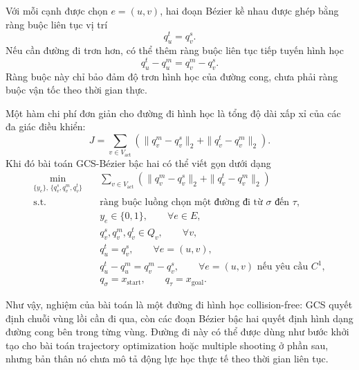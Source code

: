 Với mỗi cạnh được chọn $e=(u,v)$, hai đoạn Bézier kề nhau được ghép bằng ràng
buộc liên tục vị trí
\begin{equation}
    q_u^t = q_v^s.
\end{equation}
Nếu cần đường đi trơn hơn, có thể thêm ràng buộc liên tục tiếp tuyến hình học
\begin{equation}
    q_u^t - q_u^m
    =
    q_v^m - q_v^s.
\end{equation}
Ràng buộc này chỉ bảo đảm độ trơn hình học của đường cong, chưa phải ràng buộc
vận tốc theo thời gian thực.

Một hàm chi phí đơn giản cho đường đi hình học là tổng độ dài xấp xỉ của các đa
giác điều khiển:
\begin{equation}
    J
    =
    \sum_{v\in V_{\mathrm{act}}}
    \left(
    \|q_v^m-q_v^s\|_2
    +
    \|q_v^t-q_v^m\|_2
    \right).
\end{equation}
Khi đó bài toán GCS-Bézier bậc hai có thể viết gọn dưới dạng
\begin{equation}
    \begin{aligned}
        \min_{\{y_e\},\,\{q_v^s,q_v^m,q_v^t\}}
        \quad
         & \sum_{v\in V_{\mathrm{act}}}
        \left(
        \|q_v^m-q_v^s\|_2
        +
        \|q_v^t-q_v^m\|_2
        \right)                                                                   \\[1mm]
        \mathrm{s.t.}\quad
         & \text{ràng buộc luồng chọn một đường đi từ } \sigma \text{ đến } \tau, \\
         & y_e\in\{0,1\},\qquad \forall e\in E,                                   \\
         & q_v^s,q_v^m,q_v^t\in Q_v,
        \qquad \forall v,                                                         \\
         & q_u^t=q_v^s,
        \qquad \forall e=(u,v),                                                   \\
         & q_u^t-q_u^m=q_v^m-q_v^s,
        \qquad \forall e=(u,v) \text{ nếu yêu cầu } C^1,                          \\
         & q_{\sigma}=x_{\mathrm{start}},\qquad
        q_{\tau}=x_{\mathrm{goal}}.
    \end{aligned}
\end{equation}

Như vậy, nghiệm của bài toán là một đường đi hình học collision-free: GCS quyết
định chuỗi vùng lồi cần đi qua, còn các đoạn Bézier bậc hai quyết định hình
dạng đường cong bên trong từng vùng. Đường đi này có thể được dùng như bước
khởi tạo cho bài toán trajectory optimization hoặc multiple shooting ở phần
sau, nhưng bản thân nó chưa mô tả động lực học thực tế theo thời gian liên tục.